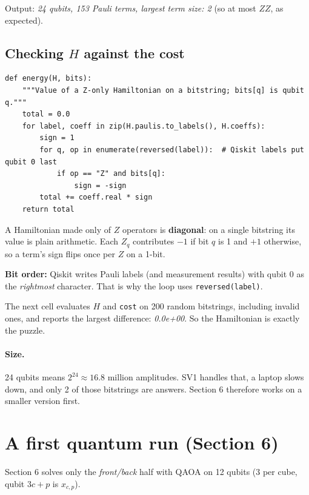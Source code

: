 \documentclass[11pt]{article}
\newcommand{\code}[1]{\texttt{#1}}
\begin{document}
Output: \emph{24 qubits, 153 Pauli terms, largest term size: 2} (so at most
$ZZ$, as expected).

\subsection{\texorpdfstring{Checking $H$ against the cost}{Checking H against the cost}}

\begin{lstlisting}
def energy(H, bits):
    """Value of a Z-only Hamiltonian on a bitstring; bits[q] is qubit q."""
    total = 0.0
    for label, coeff in zip(H.paulis.to_labels(), H.coeffs):
        sign = 1
        for q, op in enumerate(reversed(label)):  # Qiskit labels put qubit 0 last
            if op == "Z" and bits[q]:
                sign = -sign
        total += coeff.real * sign
    return total
\end{lstlisting}

A Hamiltonian made only of $Z$ operators is \textbf{diagonal}: on a single
bitstring its value is plain arithmetic. Each $Z_q$ contributes $-1$ if bit $q$
is 1 and $+1$ otherwise, so a term's sign flips once per $Z$ on a 1-bit.

\textbf{Bit order:} Qiskit writes Pauli labels (and measurement results) with
qubit 0 as the \emph{rightmost} character. That is why the loop uses
\code{reversed(label)}.

The next cell evaluates $H$ and \code{cost} on 200 random bitstrings, including
invalid ones, and reports the largest difference: \emph{0.0e+00}. So the
Hamiltonian is exactly the puzzle.

\paragraph{Size.} 24 qubits means $2^{24} \approx 16.8$ million amplitudes.
SV1 handles that, a laptop slows down, and only 2 of those bitstrings are
answers. Section 6 therefore works on a smaller version first.

\section{A first quantum run (Section 6)}

Section 6 solves only the \emph{front/back} half with QAOA on 12 qubits
(3 per cube, qubit $3c+p$ is $x_{c,p}$).
\end{document}
